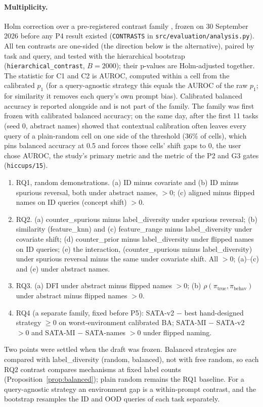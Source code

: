 \documentclass[11pt,a4paper]{article}
\newcommand{\1}{\mathbf{1}}
\theoremstyle{plain}
\theoremstyle{definition}
\theoremstyle{remark}
\begin{document}
\paragraph{Multiplicity.} Holm correction \citep{holm1979simple} over a
pre-registered contrast family \citep{nosek2018preregistration}, frozen on
30 September 2026 before any P4 result existed (\texttt{CONTRASTS} in
\texttt{src/evaluation/analysis.py}). All ten contrasts are one-sided (the
direction below is the alternative), paired by task and query, and tested
with the hierarchical bootstrap (\texttt{hierarchical\_contrast}, $B = 2000$);
their p-values are Holm-adjusted together. The statistic for C1 and C2 is
AUROC, computed within a cell from the calibrated $p_1$ (for a query-agnostic
strategy this equals the AUROC of the raw $p_1$; for similarity it removes
each query's own prompt bias). Calibrated balanced accuracy is reported
alongside and is not part of the family. The family was first frozen with
calibrated balanced accuracy; on the same day, after the first 11 tasks
(seed 0, abstract names) showed that contextual calibration often leaves every
query of a plain-random cell on one side of the threshold (36\% of cells),
which pins balanced accuracy at 0.5 and forces those cells' shift gaps to 0,
the user chose AUROC, the study's primary metric and the metric of the P2
and G3 gates (\texttt{hiccups/15}).
\begin{enumerate}[nosep,label=C\arabic*.]
  \item RQ1, random demonstrations. (a) ID minus covariate and (b) ID minus
        spurious reversal, both under abstract names, $> 0$; (c) aligned
        minus flipped names on ID queries (concept shift) $> 0$.
  \item RQ2. (a) counter\_spurious minus label\_diversity under spurious
        reversal; (b) similarity (feature\_knn) and (c) feature\_range minus
        label\_diversity under covariate shift; (d) counter\_prior minus
        label\_diversity under flipped names on ID queries; (e) the
        interaction, (counter\_spurious minus label\_diversity) under spurious
        reversal minus the same under covariate shift. All $> 0$; (a)--(c)
        and (e) under abstract names.
  \item RQ3. (a) DFI under abstract minus flipped names $> 0$; (b)
        $\rho(\pi_{\mathrm{true}}, \pi_{\mathrm{behav}})$ under abstract
        minus flipped names $> 0$.
  \item RQ4 (a separate family, fixed before P5): SATA-v2 $-$ best
        hand-designed strategy $\geq 0$ on worst-environment calibrated BA;
        SATA-MI $-$ SATA-v2 $> 0$ and SATA-MI $-$ SATA-names $> 0$ under
        flipped naming.
\end{enumerate}
Two points were settled when the draft was frozen. Balanced strategies are
compared with label\_diversity (random, balanced), not with free random, so
each RQ2 contrast compares mechanisms at fixed label counts
(Proposition~\ref{prop:balanced}); plain random remains the RQ1 baseline.
For a query-agnostic strategy an environment gap is a within-prompt
contrast, and the bootstrap resamples the ID and OOD queries of each task
separately.
\end{document}
